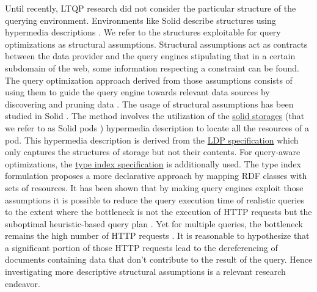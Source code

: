 Until recently, LTQP research did not consider the particular structure of the querying environment.
Environments like Solid describe structures using hypermedia descriptions \cite{Fielding}.
We refer to the structures exploitable for query optimizations as structural assumptions.
Structural assumptions act as contracts between the data provider and 
the query engines stipulating that in a certain subdomain of the web, some information respecting a constraint can be found.
The query optimization approach derived from those assumptions consists of using them to guide the query engine towards relevant data sources 
by discovering and pruning data \cite{verborgh2020guided}.
The usage of structural assumptions has been studied in Solid \cite{Taelman2023}.
The method involves the utilization of the 
\href{https://solidproject.org/TR/protocol#resources}{solid storages} (that we refer to as Solid pods \cite{Taelman2023}) hypermedia description
to locate all the resources of a pod. 
This hypermedia description is derived from the \href{https://www.w3.org/TR/ldp/}{LDP specification}
which only captures the structures of storage but not their contents.
For query-aware optimizations, the \href{https://solid.github.io/type-indexes/}{type index specification} is additionally used.
The type index formulation proposes a more declarative approach \cite{Taelman2017} by mapping RDF classes with sets of resources.
It has been shown that by making query engines exploit those assumptions it is possible to reduce the query execution time
of realistic queries to the extent where the bottleneck is not the execution of 
HTTP requests but the suboptimal heuristic-based query plan \cite{eschauzier_quweda_2023, Taelman2023}.
Yet for multiple queries, the bottleneck remains the high number of HTTP requests  \cite{eschauzier_quweda_2023}.
It is reasonable to hypothesize that a significant portion of those HTTP requests lead to the dereferencing of
documents containing data that don't contribute to the result of the query.
Hence investigating more descriptive structural assumptions is a relevant research endeavor.

